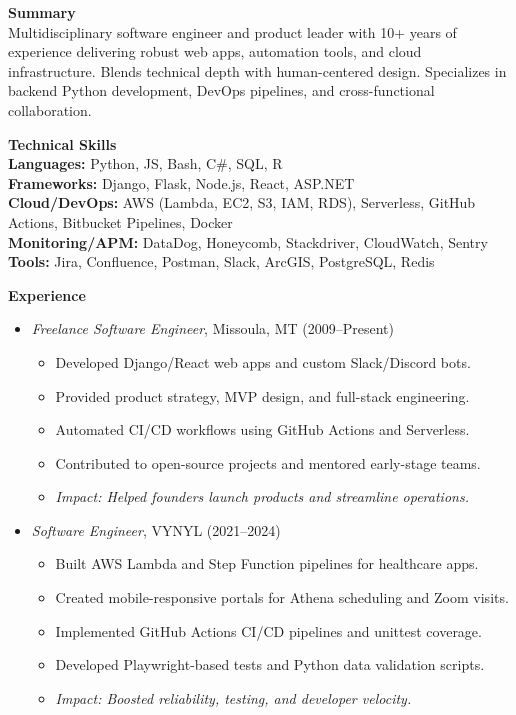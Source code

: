 \documentclass[9pt]{article}
\begin{document}
\begin{multicols}{2}
\raggedcolumns
\RaggedRight  

\noindent
\textbf{\large Summary}\\
Multidisciplinary software engineer and product leader with 10+ years of experience delivering robust web apps, automation tools, and cloud infrastructure. Blends technical depth with human-centered design. Specializes in backend Python development, DevOps pipelines, and cross-functional collaboration.

\noindent
\textbf{\large Technical Skills}\\
\textbf{Languages:} Python, JS, Bash, C\#, SQL, R \\
\textbf{Frameworks:} Django, Flask, Node.js, React, ASP.NET \\
\textbf{Cloud/DevOps:} AWS (Lambda, EC2, S3, IAM, RDS), Serverless, GitHub Actions, Bitbucket Pipelines, Docker \\
\textbf{Monitoring/APM:} DataDog, Honeycomb, Stackdriver, CloudWatch, Sentry \\
\textbf{Tools:} Jira, Confluence, Postman, Slack, ArcGIS, PostgreSQL, Redis

\noindent
\textbf{\large Experience}
\begin{itemize}[leftmargin=*]

\item \textit{Freelance Software Engineer}, Missoula, MT (2009--Present)
\begin{itemize}[leftmargin=1em]
  \item Developed Django/React web apps and custom Slack/Discord bots.
  \item Provided product strategy, MVP design, and full-stack engineering.
  \item Automated CI/CD workflows using GitHub Actions and Serverless.
  \item Contributed to open-source projects and mentored early-stage teams.
  \item \textit{Impact: Helped founders launch products and streamline operations.}
\end{itemize}

\item \textit{Software Engineer}, VYNYL (2021--2024)
\begin{itemize}[leftmargin=1em]
  \item Built AWS Lambda and Step Function pipelines for healthcare apps.
  \item Created mobile-responsive portals for Athena scheduling and Zoom visits.
  \item Implemented GitHub Actions CI/CD pipelines and unittest coverage.
  \item Developed Playwright-based tests and Python data validation scripts.
  \item \textit{Impact: Boosted reliability, testing, and developer velocity.}
\end{itemize}


\end{itemize}
\end{multicols}
\end{document}
